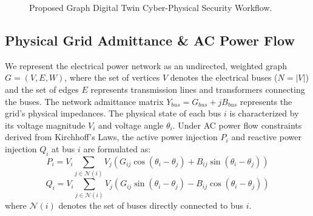 \documentclass[journal]{IEEEtran}
\begin{document}
\begin{figure}[htbp]
\centering
{}
\caption{Proposed Graph Digital Twin Cyber-Physical Security Workflow.}
\label{fig:flowchart}
\end{figure}

\subsection{Physical Grid Admittance \& AC Power Flow}
We represent the electrical power network as an undirected, weighted graph $G = (V, E, W)$, where the set of vertices $V$ denotes the electrical buses ($N = |V|$) and the set of edges $E$ represents transmission lines and transformers connecting the buses. The network admittance matrix $Y_{bus} = G_{bus} + jB_{bus}$ represents the grid's physical impedances. The physical state of each bus $i$ is characterized by its voltage magnitude $V_i$ and voltage angle $\theta_i$. Under AC power flow constraints derived from Kirchhoff's Laws, the active power injection $P_i$ and reactive power injection $Q_i$ at bus $i$ are formulated as:
\begin{equation}
P_i = V_i \sum_{j \in \mathcal{N}(i)} V_j \left( G_{ij} \cos(\theta_i - \theta_j) + B_{ij} \sin(\theta_i - \theta_j) \right)
\end{equation}
\begin{equation}
Q_i = V_i \sum_{j \in \mathcal{N}(i)} V_j \left( G_{ij} \sin(\theta_i - \theta_j) - B_{ij} \cos(\theta_i - \theta_j) \right)
\end{equation}
where $\mathcal{N}(i)$ denotes the set of buses directly connected to bus $i$.
\end{document}
